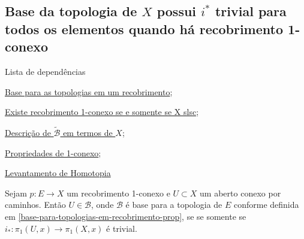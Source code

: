 \subsection{Base da topologia de $X$ possui $i^*$ trivial para todos os elementos quando há recobrimento 1-conexo} %
\label{pertence-a-base-se-e-somente-se-possui-i-trivial}
\begin{titlemize}{Lista de dependências}
	\item \hyperref[base-para-topologias-em-recobrimento-prop]{Base para as topologias em um recobrimento};\\ %
	\item \hyperref[recobrimento-1-conexo-prop]{Existe recobrimento 1-conexo se e somente se X slsc};\\
    \item \hyperref[descrição-da-base-do-recobrimento-prop]{Descrição de $\tilde{\mathcal{B}}$ em termos de $X$};\\
    \item \hyperref[1-conexo-prop]{Propriedades de 1-conexo};\\
    \item \hyperref[levantamento-de-homotopia-prop]{Levantamento de Homotopia}
\end{titlemize}
\begin{prop}%
	Sejam $p:E\rightarrow X$ um recobrimento 1-conexo e $U\subset X$ um aberto conexo por caminhos. Então $U\in \mathcal{B}$, onde $\mathcal{B}$ é base para a topologia de $E$ conforme definida em \ref{base-para-topologias-em-recobrimento-prop}, se se somente se $i_*:\pi_1(U,x)\rightarrow \pi_1(X,x)$ é trivial.\\

\end{prop}
